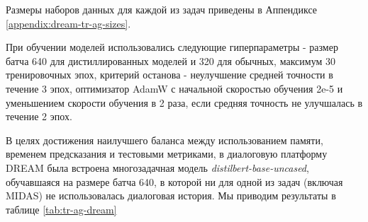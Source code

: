 Размеры наборов данных для каждой из задач приведены в Аппендиксе \ref{appendix:dream-tr-ag-sizes}. 

При обучении моделей использовались следующие гиперпараметры - размер батча 640 для дистиллированных моделей и 320 для обычных, максимум 30 тренировочных эпох, критерий останова - неулучшение средней точности в течение 3 эпох, оптимизатор AdamW с начальной скоростью обучения 2e-5 и уменьшением скорости обучения в 2 раза, если средняя точность не улучшалась в течение 2 эпох.

В целях достижения наилучшего баланса между использованием памяти, временем предсказания и тестовыми метриками, в диалоговую платформу {DREAM} была встроена многозадачная модель \textit{distilbert-base-uncased}, обучавшаяся на размере батча 640, в которой ни для одной из задач (включая MIDAS) не использовалась диалоговая история.
Мы приводим результаты в таблице \ref{tab:tr-ag-dream} 

